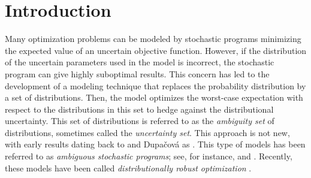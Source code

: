\documentclass[opre,nonblindrev]{informs3} %
\begin{document}
%

\section{Introduction}

Many optimization problems can be modeled by stochastic programs minimizing the expected value of an uncertain objective function.
However, if the distribution of the uncertain parameters used in the model is incorrect, the stochastic program can give highly suboptimal results.
This concern has led to the development of a modeling technique that replaces the probability distribution by a set of distributions. 
Then, the model optimizes the worst-case expectation with respect to the distributions in this set to hedge against the distributional uncertainty.
This set of distributions is referred to as the {\it ambiguity set} of distributions, sometimes called the {\it uncertainty set}.   
This approach is not new, with early results dating back to \cite{scarf1958min} and Dupa{\v{c}}ov{\'{a}} as \cite{zackova1966minimax}. 
This type of models has been referred to as {\it ambiguous stochastic programs}; see, for instance, \cite{pflug2007ambiguity} and \cite{erdogan2006ambiguous}. 
Recently, these models have been called {\it distributionally robust optimization} \citep{delage2010distributionally,goh_sim_10,mehrotra_papp_14,hanasusanto_etal_15}.  
\end{document}
